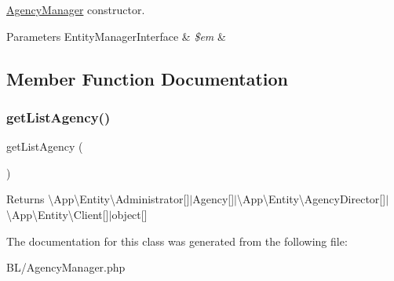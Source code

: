\mbox{\hyperlink{class_app_1_1_b_l_1_1_agency_manager}{Agency\+Manager}} constructor. 
\begin{DoxyParams}[1]{Parameters}
Entity\+Manager\+Interface & {\em \$em} & \\
\hline
\end{DoxyParams}


\subsection{Member Function Documentation}
\mbox{\label{class_app_1_1_b_l_1_1_agency_manager_a669c4f12e1952c49805cc42da3aecb9b}} 
\subsubsection{\texorpdfstring{getListAgency()}{getListAgency()}}
{\footnotesize\ttfamily get\+List\+Agency (\begin{DoxyParamCaption}{ }\end{DoxyParamCaption})}

\begin{DoxyReturn}{Returns}
\textbackslash{}\+App\textbackslash{}\+Entity\textbackslash{}\+Administrator\mbox{[}\mbox{]}$\vert$\+Agency\mbox{[}\mbox{]}$\vert$\textbackslash{}\+App\textbackslash{}\+Entity\textbackslash{}\+Agency\+Director\mbox{[}\mbox{]}$\vert$\textbackslash{}\+App\textbackslash{}\+Entity\textbackslash{}\+Client\mbox{[}\mbox{]}$\vert$object\mbox{[}\mbox{]} 
\end{DoxyReturn}


The documentation for this class was generated from the following file\+:\begin{DoxyCompactItemize}
\item 
B\+L/Agency\+Manager.\+php\end{DoxyCompactItemize}

